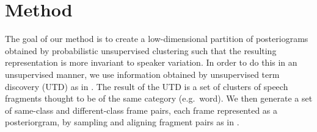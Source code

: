 \section{Method}
\label{sec:method}

The goal of our method is to create a low-dimensional partition of posteriograms obtained by probabilistic unsupervised clustering such that the resulting representation is more invariant to speaker variation.
In order to do this in an unsupervised manner, we use information obtained by unsupervised term discovery (UTD) as in \parencite{jansen2011efficient}.
The result of the UTD is a set of clusters of speech fragments thought to be of the same category (e.g.\ word).
We then generate a set of same-class and different-class frame pairs, each frame represented as a posteriorgram, by sampling and aligning fragment pairs as in \parencite{thiolliere2015hybrid}.




